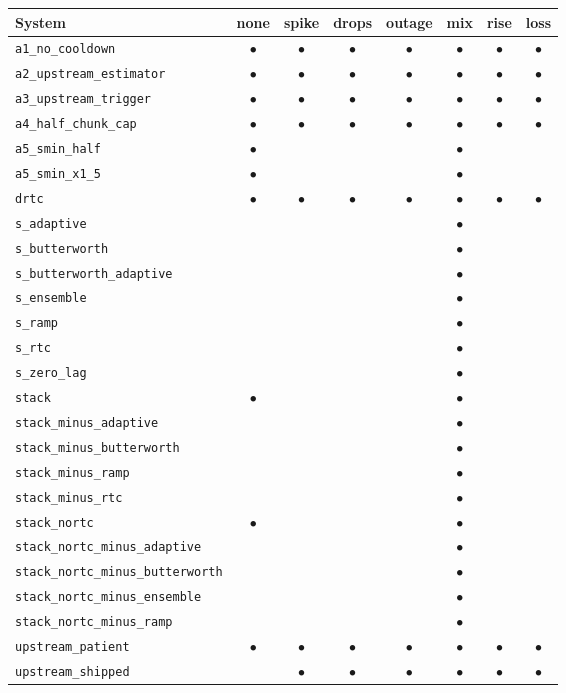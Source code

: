 \begin{tabular}{l ccccccc}
\toprule
System & none & spike & drops & outage & mix & rise & loss \\
\midrule
\texttt{a1\_no\_cooldown} & $\bullet$ & $\bullet$ & $\bullet$ & $\bullet$ & $\bullet$ & $\bullet$ & $\bullet$ \\
\texttt{a2\_upstream\_estimator} & $\bullet$ & $\bullet$ & $\bullet$ & $\bullet$ & $\bullet$ & $\bullet$ & $\bullet$ \\
\texttt{a3\_upstream\_trigger} & $\bullet$ & $\bullet$ & $\bullet$ & $\bullet$ & $\bullet$ & $\bullet$ & $\bullet$ \\
\texttt{a4\_half\_chunk\_cap} & $\bullet$ & $\bullet$ & $\bullet$ & $\bullet$ & $\bullet$ & $\bullet$ & $\bullet$ \\
\texttt{a5\_smin\_half} & $\bullet$ &  &  &  & $\bullet$ &  &  \\
\texttt{a5\_smin\_x1\_5} & $\bullet$ &  &  &  & $\bullet$ &  &  \\
\texttt{drtc} & $\bullet$ & $\bullet$ & $\bullet$ & $\bullet$ & $\bullet$ & $\bullet$ & $\bullet$ \\
\texttt{s\_adaptive} &  &  &  &  & $\bullet$ &  &  \\
\texttt{s\_butterworth} &  &  &  &  & $\bullet$ &  &  \\
\texttt{s\_butterworth\_adaptive} &  &  &  &  & $\bullet$ &  &  \\
\texttt{s\_ensemble} &  &  &  &  & $\bullet$ &  &  \\
\texttt{s\_ramp} &  &  &  &  & $\bullet$ &  &  \\
\texttt{s\_rtc} &  &  &  &  & $\bullet$ &  &  \\
\texttt{s\_zero\_lag} &  &  &  &  & $\bullet$ &  &  \\
\texttt{stack} & $\bullet$ &  &  &  & $\bullet$ &  &  \\
\texttt{stack\_minus\_adaptive} &  &  &  &  & $\bullet$ &  &  \\
\texttt{stack\_minus\_butterworth} &  &  &  &  & $\bullet$ &  &  \\
\texttt{stack\_minus\_ramp} &  &  &  &  & $\bullet$ &  &  \\
\texttt{stack\_minus\_rtc} &  &  &  &  & $\bullet$ &  &  \\
\texttt{stack\_nortc} & $\bullet$ &  &  &  & $\bullet$ &  &  \\
\texttt{stack\_nortc\_minus\_adaptive} &  &  &  &  & $\bullet$ &  &  \\
\texttt{stack\_nortc\_minus\_butterworth} &  &  &  &  & $\bullet$ &  &  \\
\texttt{stack\_nortc\_minus\_ensemble} &  &  &  &  & $\bullet$ &  &  \\
\texttt{stack\_nortc\_minus\_ramp} &  &  &  &  & $\bullet$ &  &  \\
\texttt{upstream\_patient} & $\bullet$ & $\bullet$ & $\bullet$ & $\bullet$ & $\bullet$ & $\bullet$ & $\bullet$ \\
\texttt{upstream\_shipped} &  & $\bullet$ & $\bullet$ & $\bullet$ & $\bullet$ & $\bullet$ & $\bullet$ \\
\bottomrule
\end{tabular}
